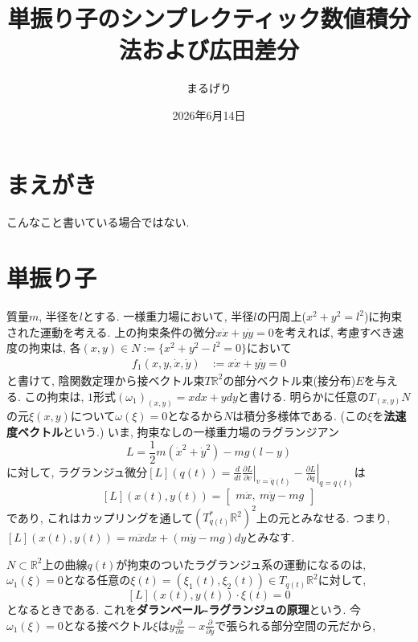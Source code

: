 \documentclass[a4paper]{ujarticle}
\title{単振り子のシンプレクティック数値積分法および広田差分}
\numberwithin{equation}{section}
\theoremstyle{definition}
\begin{document}
\date{2026年6月14日}
\author{まるげり}

\maketitle
\setcounter{section}{-1}

\section{まえがき}

    こんなこと書いている場合ではない.

\section{単振り子}
    質量$m$, 半径を$l$とする.
    一様重力場において, 半径$l$の円周上($x^2 + y^2 = l^2$)に拘束された運動を考える.
    上の拘束条件の微分$x \dot{x} + y \dot{y} = 0$を考えれば, 考慮すべき速度の拘束は, 各$(x, y) \in N := \{x^2 + y^2 - l^2 = 0\}$において
    \begin{align}
        f_1(x, y, \dot{x}, \dot{y}) &:= x \dot{x} + y \dot{y} = 0
    \end{align}
    と書けて, 陰関数定理から接ベクトル束$T \mathbb{R}^2$の部分ベクトル束(接分布)$E$を与える.
    この拘束は, $1$形式$(\omega_1)_{(x, y)} = x d x + y dy$と書ける.
    明らかに任意の$T_{(x, y)} N$の元$\xi(x, y)$について$\omega(\xi) = 0$となるから$N$は積分多様体である.
    (この$\xi$を\textbf{法速度ベクトル}という.)
    いま, 拘束なしの一様重力場のラグランジアン
    \[
        L = \frac{1}{2}m(\dot{x}^2 + \dot{y}^2) - m g (l - y)
    \]
    に対して, ラグランジュ微分$\displaystyle [L](q(t)) = \left.\frac{d}{d t} \frac{\partial L}{\partial v}\right|_{v = \dot{q}(t)} - \left.\frac{\partial L}{\partial q}\right|_{q = q(t)}$は
    \[
        [L](x(t), y(t)) = 
        \begin{bmatrix}
            m\ddot{x}, \ 
            m\ddot{y} - mg
        \end{bmatrix}
    \]
    であり, これはカップリングを通して$(T^{*}_{q(t)} \mathbb{R}^2)^2$上の元とみなせる. 
    つまり, $[L](x(t), y(t)) = m\ddot{x} dx + (m\ddot{y} - mg) dy$とみなす.

    $N \subset \mathbb{R}^2$上の曲線$q(t)$が拘束のついたラグランジュ系の運動になるのは,
    $\omega_1(\xi) = 0$となる任意の$\xi(t) = (\xi_1(t), \xi_2(t)) \in T_{q(t)} \mathbb{R}^2$に対して,
    \[
        [L](x(t), y(t)) \cdot \xi(t) = 0
    \]
    となるときである. これを\textbf{ダランベール-ラグランジュの原理}という.
    今$\omega_1(\xi) = 0$となる接ベクトル$\xi$は$\displaystyle y \frac{\partial}{\partial x} -x \frac{\partial}{\partial y}$で張られる部分空間の元だから,
\end{document}
